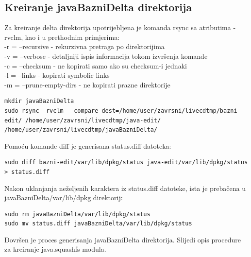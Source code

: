 \documentclass[12pt,vi]{mitthesis}
\begin{document}
\subsection*{Kreiranje javaBazniDelta direktorija}
\indent
Za kreiranje delta direktorija upotrijebljena je komanda rsync sa atributima -rvclm, kao i u prethodnim primjerima:\\
\noindent
-r = --recursive - rekurzivna pretraga po direktorijima\\
\noindent
-v = --verbose - detaljniji ispis informacija tokom izvršenja komande\\
\noindent
-c = --checksum - ne kopirati samo ako su checksum-i jednaki\\
\noindent
-l = --links - kopirati symbolic links\\
\noindent
-m = --prune-empty-dirs - ne kopirati prazne direktorije
\begin{lstlisting}[style=BashInputStyle]
mkdir javaBazniDelta
sudo rsync -rvclm --compare-dest=/home/user/zavrsni/livecdtmp/bazni-edit/ /home/user/zavrsni/livecdtmp/java-edit/ /home/user/zavrsni/livecdtmp/javaBazniDelta/
\end{lstlisting}
\noindent
Pomoću komande diff je generisana status.diff datoteka:
\begin{lstlisting}[style=BashInputStyle]
sudo diff bazni-edit/var/lib/dpkg/status java-edit/var/lib/dpkg/status > status.diff
\end{lstlisting}
\noindent
Nakon uklanjanja neželjenih karaktera iz status.diff datoteke, ista je prebačena u javaBazniDelta/var/lib/dpkg direktorij:
\begin{lstlisting}[style=BashInputStyle]
sudo rm javaBazniDelta/var/lib/dpkg/status
sudo mv status.diff javaBazniDelta/var/lib/dpkg/status
\end{lstlisting}
Dovršen je proces generisanja javaBazniDelta direktorija. Slijedi opis procedure za kreiranje java.squashfs modula.
\end{document}
